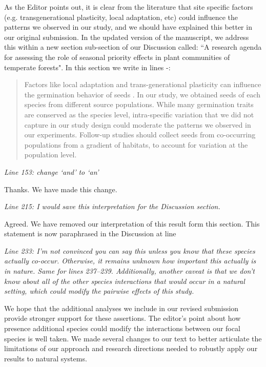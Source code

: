 \documentclass[11pt]{article}
\begin{document}
As the Editor points out, it is clear from the literature that site specific factors (e.g.  transgenerational plasticity, local adaptation, etc) could influence the patterns we observed in our study, and we should have explained this better in our original submission. In the updated version of the manuscript, we address this within a new section sub-section of our Discussion called: ``A research agenda for assessing the role of seasonal priority effects in plant communities of temperate forests". In this section we write in lines -:

\begin{quote}Factors like local adaptation and trans-generational plasticity can influence the germination behavior of seeds \citep{Donohue:2010uy,Baughman:2019ty}. In our study, we obtained seeds of each species from different source populations. While many germination traits are conserved as the species level, intra-specific variation that we did not capture in our study design could moderate the patterns we observed in our experiments. Follow-up studies should collect seeds from co-occurring populations from a gradient of habitats, to account for variation at the population level.\end{quote}

\emph{Line 153: change ‘and’ to ‘an’}

Thanks. We have made this change.

\emph{Line 215: I would save this interpretation for the Discussion section.}

Agreed. We have removed our interpretation of this result form this section. This statement is now paraphrased in the Discussion at line 

\emph{Line 233:  I’m not convinced you can say this unless you know that these species actually co-occur. Otherwise, it remains unknown how important this actually is in nature. Same for lines 237–239. Additionally, another caveat is that we don’t know about all of the other species interactions that would occur in a natural setting, which could modify the pairwise effects of this study.}

We hope that the additional analyses we include in our revised submission provide stronger support for these assertions. The editor's point about how presence additional species could modify the interactions between our focal species is well taken. We made several changes to our text to better articulate the limitations of our approach and research directions needed to robustly apply our results to natural systems.
\end{document}
